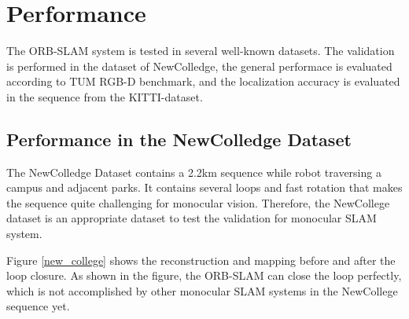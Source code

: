 \documentclass[letterpaper, 10 pt, conference]{ieeeconf}  %
\begin{document}
\section{Performance}
\label{Performance}

The ORB-SLAM system is tested in several well-known datasets. The validation  is performed in the dataset of NewColledge, the general performace is evaluated according to TUM RGB-D benchmark, and the localization accuracy is evaluated in the sequence from the KITTI-dataset.

\subsection{Performance in the NewColledge Dataset}
The NewColledge Dataset contains a 2.2km sequence while robot traversing a campus and adjacent parks. It contains several loops and fast rotation that makes the sequence quite challenging for monocular vision. Therefore, the NewCollege dataset is an appropriate dataset to test the validation for monocular SLAM system. 

Figure \ref{new_college} shows the reconstruction and mapping before and after the loop closure. As shown in the figure, the ORB-SLAM can close the loop perfectly, which is not accomplished by other monocular SLAM systems in the NewCollege sequence yet.
\end{document}
